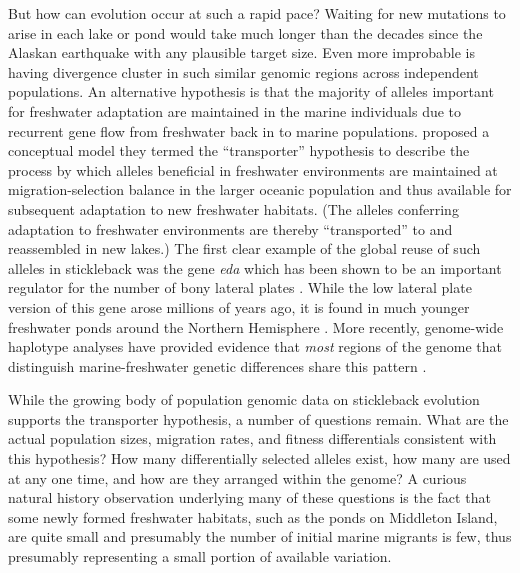 \documentclass{article}
\begin{document}
But how can evolution occur at such a rapid pace?
Waiting for new mutations to arise in each lake or pond would take much longer than the decades since the Alaskan earthquake
with any plausible target size.
Even more improbable is having divergence cluster in such similar genomic regions across independent populations. 
An alternative hypothesis
is that the majority of alleles important for freshwater adaptation are maintained in the marine individuals due to recurrent gene flow from freshwater back in to marine populations. 
\citet{schluter2009genetics} proposed a conceptual model they termed the ``transporter'' hypothesis to describe the process by which 
alleles beneficial in freshwater environments are maintained at migration-selection balance in the larger oceanic population and thus available for subsequent adaptation to new freshwater habitats.
(The alleles conferring adaptation to freshwater environments are thereby ``transported'' to and reassembled in new lakes.)
The first clear example of the global reuse of such alleles in stickleback was the gene \textit{eda} which has been shown to be an important regulator for the number of bony lateral plates 
\citep{Colosimo_2004, Cresko_2004, Colosimo_2005}. 
While the low lateral plate version of this gene arose millions of years ago, it is found in much younger freshwater ponds around the Northern Hemisphere 
\citep{O'Brian_2015}. 
More recently, genome-wide haplotype analyses have provided evidence that \textit{most} regions of the genome that distinguish marine-freshwater genetic differences share this pattern \citep{nelson2017ancient}. 

While the growing body of population genomic data on stickleback evolution supports the transporter hypothesis, a number of questions remain. 
What are the actual population sizes, migration rates, and fitness differentials consistent with this hypothesis? 
How many differentially selected alleles exist, how many are used at any one time, and how are they arranged within the genome? 
A curious natural history observation underlying many of these questions is the fact that some newly formed freshwater habitats, such as the ponds on Middleton Island, 
are quite small and presumably the number of initial marine migrants is few,
thus presumably representing a small portion of available variation.
\end{document}
